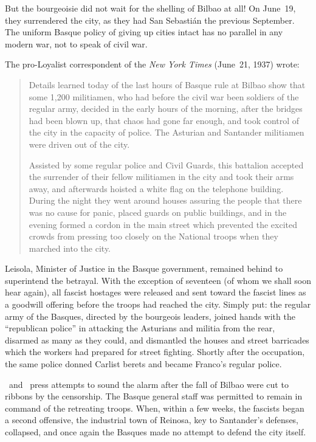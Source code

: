 But the bourgeoisie did not wait for the shelling of Bilbao at all! On June~19, they surrendered the city\kn, as they had San Sebasti\'an the previous September. The uniform Basque policy of giving up cities intact has no parallel in any modern war\kn, not to speak of civil war.

\medskip

The pro-Loyalist correspondent of the \emph{New York Times} (June~21, 1937) wrote:

\begin{quotation}
  Details learned today of the last hours of Basque rule at Bilbao show that some \textsc{1\kn,200} militiamen, who had before the civil war been soldiers of the regular army, decided in the early hours of the morning, after the bridges had been blown up, that chaos had gone far enough, and took control of the city in the capacity of police. The Asturian and Santander militiamen were driven out of the city.
  
  Assisted by some regular police and Civil Guards, this battalion accepted the surrender of their fellow militiamen in the city and took their arms away\kn, and afterwards hoisted a white flag on the telephone building. During the night they went around houses assuring the people that there was no cause for panic, placed guards on public buildings, and in the evening formed a cordon in the main street which prevented the excited crowds from pressing too closely on the National troops when they marched into the city.
\end{quotation}

Leisola, Minister of Justice in the Basque government, remained behind to superintend the betrayal. With the exception of seventeen (of whom we shall soon hear again), all fascist hostages were released and sent toward the fascist lines as a goodwill offering before the troops had reached the city. Simply put: the regular army of the Basques, directed by the bourgeois leaders, joined hands with the ``republican police'' in attacking the Asturians and militia from the rear\kn, disarmed as many as they could, and dismantled the houses and street barricades which the workers had prepared for street fighting. Shortly after the occupation, the same police donned Carlist berets and became Franco’s regular police.

\CNT\ and \UGT\ press attempts to sound the alarm after the fall of Bilbao were cut to ribbons by the censorship. The Basque general staff was permitted to remain in command of the retreating troops. When, within a few weeks, the fascists began a second offensive, the industrial town of Reinosa, key to Santander’s defenses, collapsed, and once again the Basques made no attempt to defend the city itself.


